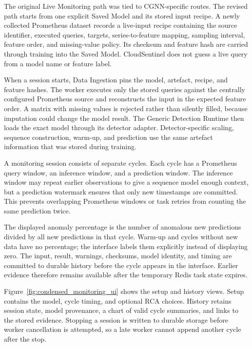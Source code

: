 The original Live Monitoring path was tied to CGNN-specific routes. The revised path starts from one explicit Saved Model and its stored input recipe. A newly collected Prometheus dataset records a live-input recipe containing the source identifier, executed queries, targets, series-to-feature mapping, sampling interval, feature order, and missing-value policy. Its checksum and feature hash are carried through training into the Saved Model. CloudSentinel does not guess a live query from a model name or feature label.

When a session starts, Data Ingestion pins the model, artefact, recipe, and feature hashes. The worker executes only the stored queries against the centrally configured Prometheus source and reconstructs the input in the expected feature order. A matrix with missing values is rejected rather than silently filled, because imputation could change the model result. The Generic Detection Runtime then loads the exact model through its detector adapter. Detector-specific scaling, sequence construction, warm-up, and prediction use the same artefact information that was stored during training.

A monitoring session consists of separate cycles. Each cycle has a Prometheus query window, an inference window, and a prediction window. The inference window may repeat earlier observations to give a sequence model enough context, but a prediction watermark ensures that only new timestamps are committed. This prevents overlapping Prometheus windows or task retries from counting the same prediction twice.

The displayed anomaly percentage is the number of anomalous new predictions divided by all new predictions in that cycle. Warm-up and cycles without new data have no percentage; the interface labels them explicitly instead of displaying zero. The input, result, warnings, checksums, model identity, and timing are committed to durable history before the cycle appears in the interface. Earlier evidence therefore remains available after the temporary Redis task state expires.

Figure~\ref{fig:condensed_monitoring_ui} shows the setup and history views. Setup contains the model, cycle timing, and optional RCA choices. History retains session state, model provenance, a chart of valid cycle summaries, and links to the stored evidence. Stopping a session is written to durable storage before worker cancellation is attempted, so a late worker cannot append another cycle after the stop.

